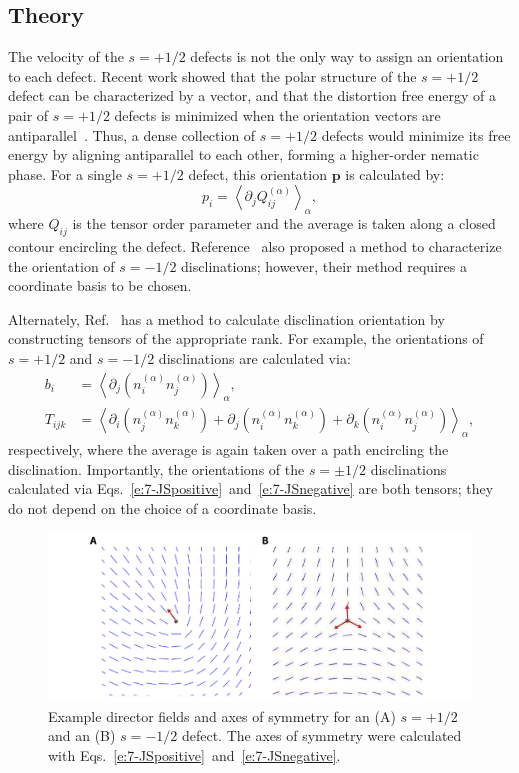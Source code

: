 \subsection{Theory}
The velocity of the $s = +1/2$ defects is not the only way to assign an orientation to each defect.
Recent work showed that the polar structure of the $s = +1/2$ defect can be characterized by a vector, and that the distortion free energy of a pair of $s = +1/2$ defects is minimized when the orientation vectors are antiparallel~\cite{RN6}.
Thus, a dense collection of $s = +1/2$ defects would minimize its free energy by aligning antiparallel to each other, forming a higher-order nematic phase.
For a single $s = +1/2$ defect, this orientation $\mathbf{p}$ is calculated by:
\begin{equation}
  p_i = \left \langle \partial_j Q_{ij}^{(\alpha)} \right \rangle_{\alpha},\label{e:7-LGpositive}
\end{equation}
where $Q_{ij}$ is the tensor order parameter and the average is taken along a closed contour encircling the defect.
Reference~\cite{RN6} also proposed a method to characterize the orientation of $s = -1/2$ disclinations; however, their method requires a coordinate basis to be chosen.

Alternately, Ref.~\cite{jsel} has a method to calculate disclination orientation by constructing tensors of the appropriate rank.
For example, the orientations of $s = +1/2$ and $s = -1/2$ disclinations are calculated via:
\begin{align}
    b_i &= \left \langle \partial_j (n_{i}^{(\alpha)}n_{j}^{(\alpha)}) \right \rangle_{\alpha},\label{e:7-JSpositive} \\
    T_{ijk} &= \left \langle \partial_i (n_{j}^{(\alpha)}n_{k}^{(\alpha)}) + \partial_j (n_{i}^{(\alpha)}n_{k}^{(\alpha)}) + \partial_k (n_{i}^{(\alpha)}n_{j}^{(\alpha)}) \right \rangle_{\alpha},\label{e:7-JSnegative}
\end{align}
respectively, where the average is again taken over a path encircling the disclination.
Importantly, the orientations of the $s = \pm 1/2$ disclinations calculated via Eqs.~\ref{e:7-JSpositive}~and~\ref{e:7-JSnegative} are both tensors; they do not depend on the choice of a coordinate basis.
\begin{figure}
  \centering
  \includegraphics{figures/C7/Ch7-Figs_BasicOrients.png}
  \caption{Example director fields and axes of symmetry for an (A) $s = +1/2$ and an (B) $s=-1/2$ defect.
  The axes of symmetry were calculated with Eqs.~\ref{e:7-JSpositive}~and~\ref{e:7-JSnegative}.
  }\label{f:7-BasicOrients}
\end{figure}

